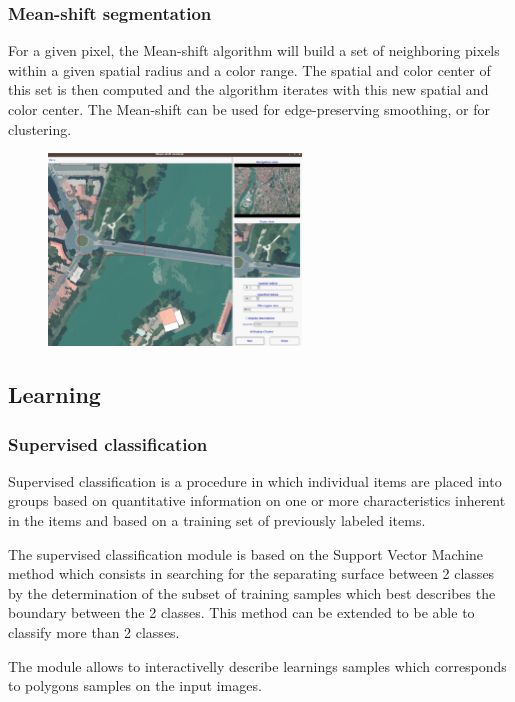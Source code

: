 \subsubsection{Mean-shift segmentation}

For a given pixel, the Mean-shift algorithm will build a set of
neighboring pixels within a given spatial radius and a color
range. The spatial and color center of this set is then computed and
the algorithm iterates with this new spatial and color center. The
Mean-shift can be used for edge-preserving smoothing, or for
clustering.

\begin{figure}
  \center
  \includegraphics[width=0.6\textwidth]{../Art/MonteverdiImages/monteverdi_mean_shift.png}
  \label{fig:meanshift}
\end{figure}

\subsection{Learning}
\subsubsection{Supervised classification}
Supervised classification is a procedure in which individual items are
placed into groups based on quantitative information on one or more
characteristics inherent in the items and based on a training set of
previously labeled items.

The supervised classification module is based on the Support Vector
Machine method which consists in searching for the separating surface
between 2 classes by the determination of the subset of training
samples which best describes the boundary between the 2 classes. This
method can be extended to be able to classify more than 2 classes.

The module allows to interactivelly describe learnings samples which
corresponds to polygons samples on the input images.

